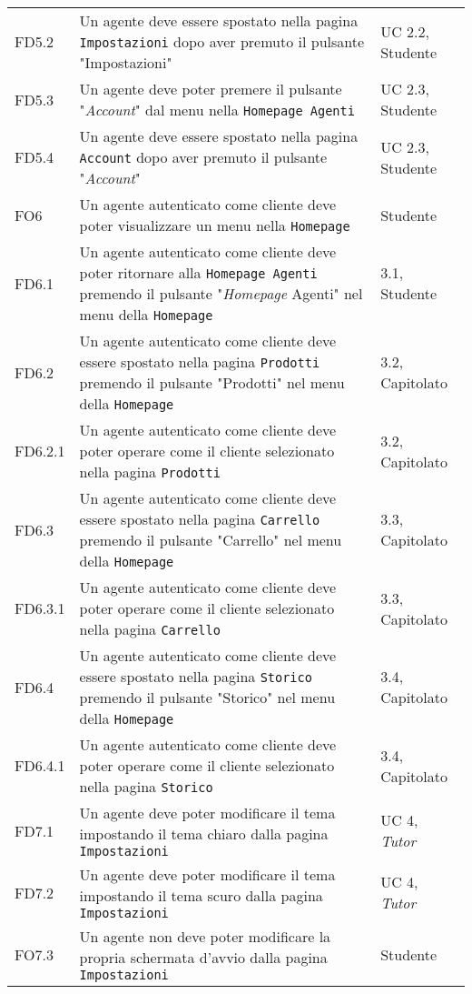 \begin{center}
\begin{longtable}{|p{2.25cm}|p{7.75cm}|p{2.25cm}|}
    FD5.2 & Un agente deve essere spostato nella pagina \texttt{Impostazioni} dopo aver premuto il pulsante "Impostazioni" & UC 2.2, Studente \\
    FD5.3 & Un agente deve poter premere il pulsante "\textit{Account}" dal menu nella \texttt{Homepage Agenti} & UC 2.3, Studente \\
    FD5.4 & Un agente deve essere spostato nella pagina \texttt{Account} dopo aver premuto il pulsante "\textit{Account}" & UC 2.3, Studente \\
    FO6 & Un agente autenticato come cliente deve poter visualizzare un menu nella \texttt{Homepage} & Studente \\
    FD6.1 & Un agente autenticato come cliente deve poter ritornare alla \texttt{Homepage Agenti} premendo 
            il pulsante "\textit{Homepage} Agenti" nel menu della \texttt{Homepage} & 3.1, Studente \\
    FD6.2 & Un agente autenticato come cliente deve essere spostato nella pagina \texttt{Prodotti} premendo 
            il pulsante "Prodotti" nel menu della \texttt{Homepage} & 3.2, Capitolato \\
    FD6.2.1 & Un agente autenticato come cliente deve poter operare come il cliente selezionato nella pagina \texttt{Prodotti} & 3.2, Capitolato \\
    FD6.3 & Un agente autenticato come cliente deve essere spostato nella pagina \texttt{Carrello} premendo 
            il pulsante "Carrello" nel menu della \texttt{Homepage} & 3.3, Capitolato \\
    FD6.3.1 & Un agente autenticato come cliente deve poter operare come il cliente selezionato nella pagina \texttt{Carrello} & 3.3, Capitolato \\
    FD6.4 & Un agente autenticato come cliente deve essere spostato nella pagina \texttt{Storico} premendo 
            il pulsante "Storico" nel menu della \texttt{Homepage} & 3.4, Capitolato \\
    FD6.4.1 & Un agente autenticato come cliente deve poter operare come il cliente selezionato nella pagina \texttt{Storico} & 3.4, Capitolato \\
    FD7.1 & Un agente deve poter modificare il tema impostando il tema chiaro dalla pagina \texttt{Impostazioni} & UC 4, \textit{Tutor} \\
    FD7.2 & Un agente deve poter modificare il tema impostando il tema scuro dalla pagina \texttt{Impostazioni} & UC 4, \textit{Tutor} \\
    FO7.3 & Un agente non deve poter modificare la propria schermata d'avvio dalla pagina \texttt{Impostazioni} & Studente \\

\end{longtable}
\end{center}
